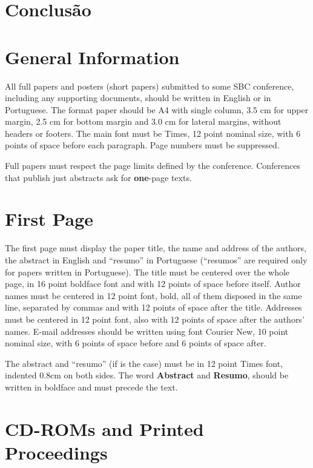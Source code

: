 \documentclass[12pt]{article}
\begin{document}
\section{Conclusão}

\section{General Information}

All full papers and posters (short papers) submitted to some SBC conference,
including any supporting documents, should be written in English or in
Portuguese. The format paper should be A4 with single column, 3.5 cm for upper
margin, 2.5 cm for bottom margin and 3.0 cm for lateral margins, without
headers or footers. The main font must be Times, 12 point nominal size, with 6
points of space before each paragraph. Page numbers must be suppressed.

Full papers must respect the page limits defined by the conference.
Conferences that publish just abstracts ask for \textbf{one}-page texts.

\section{First Page} \label{sec:firstpage}

The first page must display the paper title, the name and address of the
authors, the abstract in English and ``resumo'' in Portuguese (``resumos'' are
required only for papers written in Portuguese). The title must be centered
over the whole page, in 16 point boldface font and with 12 points of space
before itself. Author names must be centered in 12 point font, bold, all of
them disposed in the same line, separated by commas and with 12 points of
space after the title. Addresses must be centered in 12 point font, also with
12 points of space after the authors' names. E-mail addresses should be
written using font Courier New, 10 point nominal size, with 6 points of space
before and 6 points of space after.

The abstract and ``resumo'' (if is the case) must be in 12 point Times font,
indented 0.8cm on both sides. The word \textbf{Abstract} and \textbf{Resumo},
should be written in boldface and must precede the text.

\section{CD-ROMs and Printed Proceedings}
\end{document}
